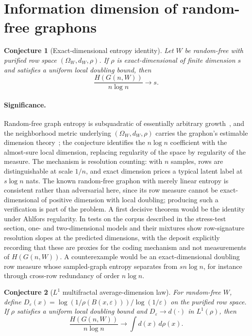 \documentclass[11pt]{article}
\newtheorem{conjecture}{Conjecture}
\theoremstyle{definition}
\begin{document}
\section{Information dimension of random-free graphons}

\begin{conjecture}[Exact-dimensional entropy identity]\label{ac16}
Let $W$ be random-free with purified row space $(\Omega_W,d_W,\rho)$.  If $\rho$ is exact-dimensional of finite dimension $s$ and satisfies a uniform local doubling bound, then
\[
\frac{H(G(n,W))}{n\log n}\longrightarrow s.
\]
\end{conjecture}

\paragraph{Significance.}
Random-free graph entropy is subquadratic of essentially arbitrary growth~\cite{HN13}, and the neighborhood metric underlying $(\Omega_W,d_W,\rho)$ carries the graphon's estimable dimension theory~\cite{Iss21}; the conjecture identifies the $n\log n$ coefficient with the almost-sure local dimension, replacing regularity of the space by regularity of the measure.  The mechanism is resolution counting: with $n$ samples, rows are distinguishable at scale $1/n$, and exact dimension prices a typical latent label at $s\log n$ nats.  The known random-free graphon with merely linear entropy is consistent rather than adversarial here, since its row measure cannot be exact-dimensional of positive dimension with local doubling; producing such a verification is part of the problem.  A first decisive theorem would be the identity under Ahlfors regularity.  In tests on the corpus described in the stress-test section, one- and two-dimensional models and their mixtures show row-signature resolution slopes at the predicted dimensions, with the deposit explicitly recording that these are proxies for the coding mechanism and not measurements of $H(G(n,W))$.  A counterexample would be an exact-dimensional doubling row measure whose sampled-graph entropy separates from $sn\log n$, for instance through cross-row redundancy of order $n\log n$.

\begin{conjecture}[$L^1$ multifractal average-dimension law]\label{ac17}
For random-free $W$, define $D_\varepsilon(x)=\log(1/\rho(B(x,\varepsilon)))/\log(1/\varepsilon)$ on the purified row space.  If $\rho$ satisfies a uniform local doubling bound and $D_\varepsilon\to d(\cdot)$ in $L^1(\rho)$, then
\[
\frac{H(G(n,W))}{n\log n}\longrightarrow\int d(x)\,d\rho(x).
\]
\end{conjecture}
\end{document}
